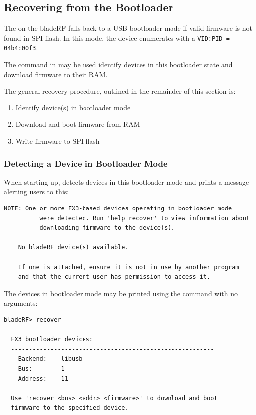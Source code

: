 \newpage
\subsection{Recovering from the Bootloader} \label{sec:recovery}

The  on the bladeRF falls back to a USB bootloader mode if valid
firmware is not found in SPI flash. In this mode, the device enumerates
with a \texttt{VID:PID = 04b4:00f3}. 

The  command in \bladerfcli may be used identify
devices in this bootloader state and download firmware to their RAM.

The general recovery procedure, outlined in the remainder of this section is:
\begin{enumerate}
    \item Identify device(s) in bootloader mode
    \item Download and boot firmware from RAM
    \item Write firmware to SPI flash
\end{enumerate}

\subsubsection{Detecting a Device in Bootloader Mode}
When starting up, \bladerfcli detects devices in this bootloader mode
and prints a message alerting users to this: \\

\begin{lstlisting}[style=snippet]
    NOTE: One or more FX3-based devices operating in bootloader mode
          were detected. Run 'help recover' to view information about
          downloading firmware to the device(s).

    No bladeRF device(s) available.
    
    If one is attached, ensure it is not in use by another program
    and that the current user has permission to access it.
\end{lstlisting}

The devices in bootloader mode may be printed using the  command
with no arguments: \\

\begin{lstlisting}[style=snippet]
bladeRF> recover

  FX3 bootloader devices:
  ---------------------------------------------------------
    Backend:    libusb
    Bus:        1
    Address:    11

  Use 'recover <bus> <addr> <firmware>' to download and boot
  firmware to the specified device.
\end{lstlisting}

